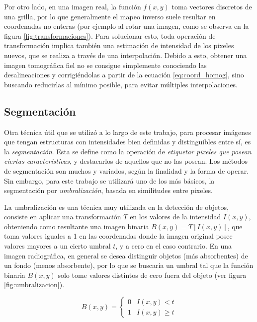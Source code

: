 Por otro lado, en una imagen real, la función $f(x,y)$ toma vectores discretos de una grilla,
por lo que generalmente el mapeo inverso suele resultar en coordenadas no enteras
(por ejemplo al rotar una imagen, como se observa en la figura \ref{fig:transformaciones}).
Para solucionar esto, toda operación de transformación implica también una
estimación de intensidad de los pixeles nuevos, que se realiza a través de una
interpolación. Debido a esto, obtener una imagen tomográfica fiel no se consigue
simplemente conociendo las desalineaciones y corrigiéndolas a partir de la ecuación
\ref{eq:coord_homog}, sino buscando reducirlas al mínimo posible, para evitar
múltiples interpolaciones.

\subsection{Segmentación}

Otra técnica útil que se utilizó a lo largo de este trabajo, para procesar imágenes
que tengan estructuras con intensidades bien definidas y distinguibles entre sí, es la
\textit{segmentación}. Esta se define como la operación de \textit{etiquetar pixeles que posean
ciertas características}, y destacarlos de aquellos que no las posean. Los métodos
de segmentación son muchos y variados, según la finalidad y la forma de operar. Sin
embargo, para este trabajo se utilizará uno de los más básicos, la segmentación
por \textit{umbralización}, basada en similitudes entre pixeles.

La umbralización es una técnica muy utilizada en la detección de objetos, consiste
en aplicar una transformación $T$ en los valores de la intensidad $I(x,y)$, obteniendo
como resultante una imagen binaria $B(x,y)=T[I(x,y)]$, que toma valores iguales a 1 en
las coordenadas donde la imagen original posee valores mayores a un cierto umbral $t$,
y a cero en el caso contrario. En una imagen radiográfica, en general se
desea distinguir objetos (más absorbentes) de un fondo (menos absorbente), por lo
que se buscaría un umbral tal que la función binaria $B(x,y)$ solo tome valores
distintos de cero fuera del objeto (ver figura \ref{fig:umbralizacion}).

\begin{equation}
    B(x,y)=
    \begin{cases}
        0 & I(x,y)<t\\
        1 & I(x,y)\geq t
    \end{cases}
    \label{eq:umbralización}
\end{equation}

